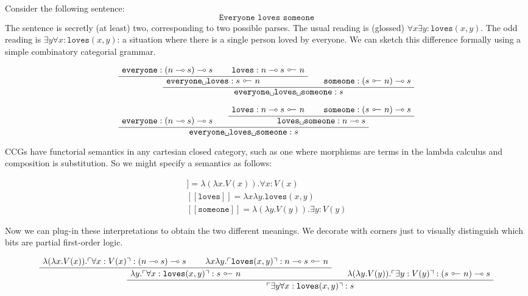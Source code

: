 \begin{example}
Consider the following sentence:
\[\texttt{Everyone loves someone}\]
The sentence is secretly (at least) two, corresponding to two possible parses. The usual reading is (glossed) $\forall x \exists y : \texttt{loves}(x,y)$. The odd reading is $\exists y \forall x : \texttt{loves}(x,y)$: a situation where there is a single person loved by everyone. We can sketch this difference formally using a simple combinatory categorial grammar.

\[
\AxiomC{$\texttt{everyone} : (n \multimap s) \multimap s$}
\AxiomC{$\texttt{loves} : n \multimap s \ \rotatebox[origin=c]{180}{$\multimap$} \ n$}
\BinaryInfC{$\texttt{everyone\textvisiblespace loves} : s \ \rotatebox[origin=c]{180}{$\multimap$} \ n$}
\AxiomC{$\texttt{someone} : (s \ \rotatebox[origin=c]{180}{$\multimap$} \ n) \multimap s$}
\BinaryInfC{$\texttt{everyone\textvisiblespace loves\textvisiblespace someone} : s$}
\DisplayProof
\]

\[
\AxiomC{$\texttt{everyone} : (n \multimap s) \multimap s$}
\AxiomC{$\texttt{loves} : n \multimap s \ \rotatebox[origin=c]{180}{$\multimap$} \ n$}
\AxiomC{$\texttt{someone} : (s \ \rotatebox[origin=c]{180}{$\multimap$} \ n) \multimap s$}
\BinaryInfC{$\texttt{loves\textvisiblespace someone} : n \multimap s$}
\BinaryInfC{$\texttt{everyone\textvisiblespace loves\textvisiblespace someone} : s$}
\DisplayProof
\]

CCGs have functorial semantics in any cartesian closed category, such as one where morphisms are terms in the lambda calculus and composition is substitution. So we might specify a semantics as follows:

\begin{align}
[\![ \texttt{everyone} ]\!] = \lambda (\lambda x . V(x)) . \forall x : V(x) \\
[\![ \texttt{loves} ]\!] = \lambda x \lambda y . \texttt{loves}(x,y) \\
[\![ \texttt{someone} ]\!] = \lambda (\lambda y . V(y)) . \exists y : V(y)
\end{align}

Now we can plug-in these interpretations to obtain the two different meanings. We decorate with corners just to visually distinguish which bits are partial first-order logic.

\[
\AxiomC{$\lambda (\lambda x . V(x)) . \ulcorner \forall x : V(x) \urcorner : (n \multimap s) \multimap s$}
\AxiomC{$\lambda x \lambda y . \ulcorner \texttt{loves}(x,y) \urcorner : n \multimap s \ \rotatebox[origin=c]{180}{$\multimap$} \ n$}
\BinaryInfC{$ \lambda y . \ulcorner \forall x : \texttt{loves}(x,y) \urcorner : s \ \rotatebox[origin=c]{180}{$\multimap$} \ n$}
\AxiomC{$\lambda (\lambda y . V(y)) . \ulcorner \exists y : V(y) \urcorner : (s \ \rotatebox[origin=c]{180}{$\multimap$} \ n) \multimap s$}
\BinaryInfC{$ \ulcorner \exists y \forall x : \texttt{loves}(x,y) \urcorner : s$}
\DisplayProof
\]


\end{example}
